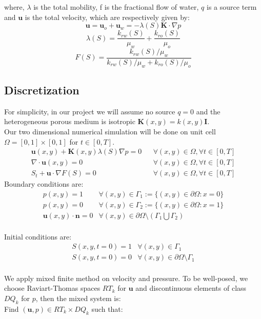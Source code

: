 \documentclass[12pt]{article}
\begin{document}
\indent where, $\lambda$ is the total mobility, f is the fractional
flow of water, $q$ is a source term and $\mathbf{u}$ is the total
velocity, which are respectively given by:
$$\mathbf{u} =
\mathbf{u}_{o} + \mathbf{u}_{w} = -\lambda(S) \mathbf{K}\cdot\nabla
p$$
$$\lambda(S) = \frac{k_{rw}(S)}{\mu_{w}}+\frac{k_{ro}(S)}{\mu_{o}}$$
$$F(S) = \frac{k_{rw}(S)/\mu_{w}}{k_{rw}(S)/\mu_{w} + k_{ro}(S)/\mu_{o}}$$


\subsection{Discretization}

 For simplicity, in our project we will assume no
source $q=0$ and the heterogeneous porous medium is isotropic
$\mathbf{K}(x,y) =
k(x,y) \mathbf{I}$. \\
Our two dimensional numerical simulation will be done on unit cell
$\Omega = [0,1]\times [0,1]$ for $t\in [0,T]$.
\begin {eqnarray}
\mathbf{u}(x,y)+\mathbf{K}(x,y)\lambda(S) \nabla p= 0 && \forall(x,y)\in\Omega, \forall t\in [0,T]\\
\nabla \cdot\mathbf{u}(x,y)= 0 && \forall(x,y)\in\Omega, \forall t \in [0,T] \\
S_{t} + \mathbf{u} \cdot \nabla F(S) = 0&& \forall(x,y)\in\Omega,
\forall t \in [0,T]
\end {eqnarray}
 Boundary conditions are:
\[
\begin {array}{cr}
p(x,y)=1 & \forall(x,y)\in \Gamma_{1}:=\{(x,y)\in \partial \Omega: x=0\}\\
p(x,y)=0 & \forall(x,y)\in  \Gamma_{2}:=\{(x,y)\in \partial \Omega: x=1\}\\
\mathbf{u}(x,y)\cdot \mathbf{n}=0 & \forall(x,y)\in
\partial\Omega \setminus(\Gamma_{1}\bigcup \Gamma_{2})
\end {array}
\]
\\
Initial conditions are:
\[
\begin {array}{cr}
S(x,y,t=0)= 1& \forall (x,y) \in \Gamma_{1}\\
S(x,y,t=0) = 0 & \forall(x,y)\in \partial \Omega \setminus
\Gamma_{1}
\end {array}
\]
\\
We apply mixed finite method on velocity and pressure. To be
well-posed, we choose Raviart-Thomas spaces $RT_{k}$ for
$\mathbf{u}$ and discontinuous elements of class $DQ_{k}$ for $p$,
then the mixed
system is:\\
Find $(\mathbf{u},p)\in RT_{k}\times DQ_{k}$ such that:
\end{document}

